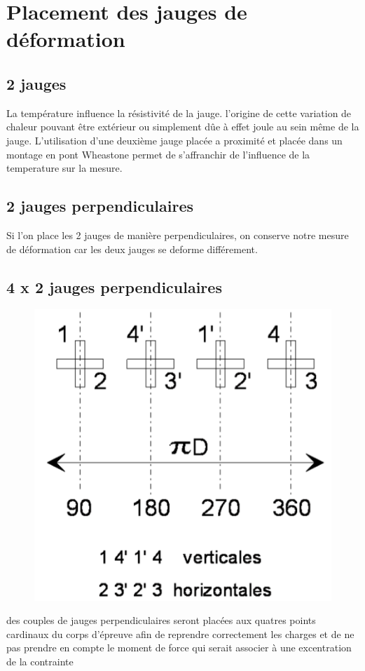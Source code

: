 \documentclass[11pt,a4paper]{report}
\begin{document}
\section{Placement des jauges de déformation}
\subsection{2 jauges}
La température influence la résistivité de la jauge. l'origine de cette variation de chaleur pouvant être extérieur ou simplement dûe à effet joule au sein même de la jauge. L'utilisation d'une deuxième jauge placée a proximité et placée dans un montage en pont Wheastone permet de s'affranchir de l'influence de la temperature sur la mesure.
\subsection{2 jauges perpendiculaires}
Si l'on place les 2 jauges de manière perpendiculaires, on conserve notre mesure de déformation car les deux jauges se deforme différement.
\subsection{4 x 2 jauges perpendiculaires}
\begin{figure}
\includegraphics[scale=0.2]{jauge.png} 
\end{figure}
des couples de jauges perpendiculaires seront placées aux quatres points cardinaux du corps d'épreuve afin de reprendre correctement les charges et de ne pas prendre en compte le moment de force qui serait associer à une excentration de la contrainte
\end{document}
